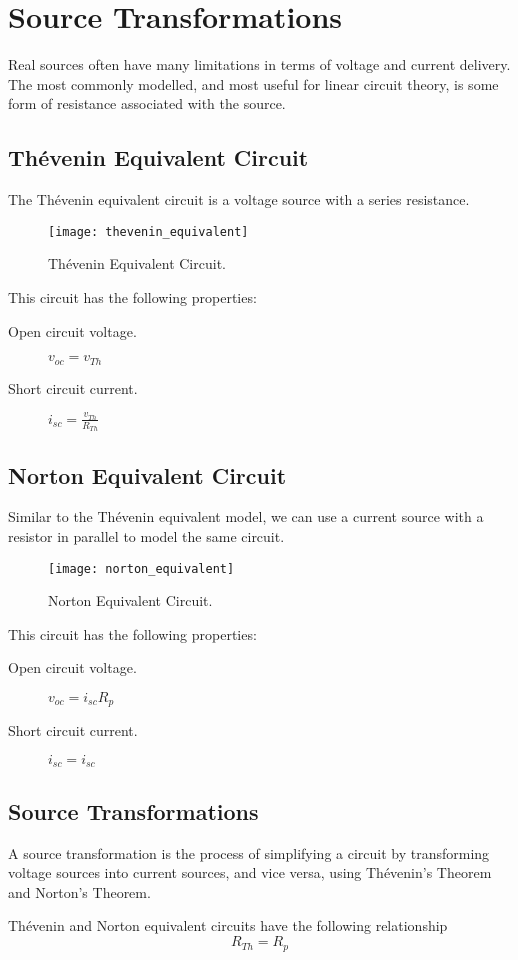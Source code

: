 \documentclass{article}
\begin{document}
\section{Source Transformations}
Real sources often have many limitations in terms of voltage and current delivery.
The most commonly modelled, and most useful for linear circuit theory, is some form of
resistance associated with the source.
\subsection{Thévenin Equivalent Circuit}
\begin{definition}
    The Thévenin equivalent circuit is a voltage source with a series resistance.
    \begin{figure}[H]
        \centering
        \texttt{[image: thevenin\_equivalent]}
        \caption{Thévenin Equivalent Circuit.}
    \end{figure}
    This circuit has the following properties:
    \begin{description}
        \item[Open circuit voltage.] $v_{oc} = v_{Th}$
        \item[Short circuit current.] $i_{sc} = \frac{v_{Th}}{R_{Th}}$
    \end{description}
\end{definition}
\subsection{Norton Equivalent Circuit}
\begin{definition}
    Similar to the Thévenin equivalent model, we can use a current source with
    a resistor in parallel to model the same circuit.
    \begin{figure}[H]
        \centering
        \texttt{[image: norton\_equivalent]}
        \caption{Norton Equivalent Circuit.}
    \end{figure}
    This circuit has the following properties:
    \begin{description}
        \item[Open circuit voltage.] $v_{oc} = i_{sc}R_{p}$
        \item[Short circuit current.] $i_{sc} = i_{sc}$
    \end{description}
\end{definition}
\subsection{Source Transformations}
A source transformation is the process of simplifying a circuit by transforming
voltage sources into current sources, and vice versa, using Thévenin's Theorem and Norton's
Theorem.
\begin{theorem}
    Thévenin and Norton equivalent circuits have the following relationship
    \begin{equation*}
        R_{Th} = R_{p}
    \end{equation*}
\end{theorem}
\end{document}
